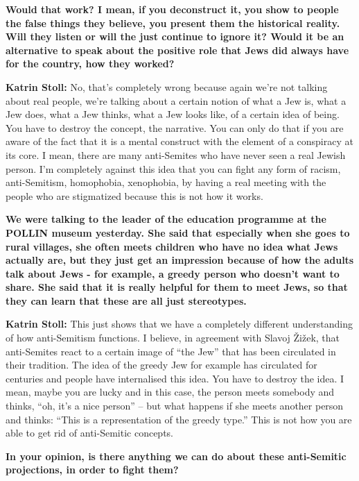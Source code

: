 \textbf{Would that work? I mean, if you deconstruct it, you show to people the false things they believe, you present them the historical reality. Will they listen or will the just continue to ignore it? Would it be an alternative to speak about the positive role that Jews did always have for the country, how they worked?} 

\textbf{Katrin Stoll:} No, that’s completely wrong because again we're not talking about real people, we're talking about a certain notion of what a Jew is, what a Jew does, what a Jew thinks, what a Jew looks like, of a certain idea of being.  You have to destroy the concept, the narrative. You can only do that if you are aware of the fact that it is a mental construct with the element of a conspiracy at its core. I mean, there are many anti-Semites who have never seen a real Jewish person. I’m completely against this idea that you can fight any form of racism, anti-Semitism, homophobia, xenophobia, by having a real meeting with the people who are stigmatized because this is not how it works. 

\textbf{We were talking to the leader of the education programme at the POLLIN museum yesterday. She said that especially when she goes to rural villages, she often meets children who have no idea what Jews actually are, but they just get an impression because of how the adults talk about Jews - for example, a greedy person who doesn’t want to share. She said that it is really helpful for them to meet Jews, so that they can learn that these are all just stereotypes.} 

\textbf{Katrin Stoll:} This just shows that we have a completely different understanding of how anti-Semitism functions. I believe, in agreement with Slavoj Žižek, that anti-Semites react to a certain image of ``the Jew'' that has been circulated in their tradition. The idea of the greedy Jew for example has circulated for centuries and people have internalised this idea. You have to destroy the idea. I mean, maybe you are lucky and in this case, the person meets somebody and thinks, ``oh, it’s a nice person'' – but what happens if she meets another person and thinks: ``This is a representation of the greedy type.'' This is not how you are able to get rid of anti-Semitic concepts. 

\textbf{In your opinion, is there anything we can do about these anti-Semitic projections, in order to fight them?} 

